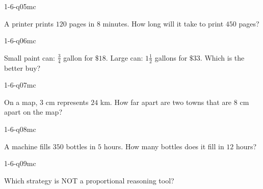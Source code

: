 \begin{practiceQuestion}{1-6-q05}{mc}
\begin{questionText}
A printer prints $120$ pages in $8$ minutes. How long will it take to print $450$ pages?
\end{questionText}
\end{practiceQuestion}

\begin{practiceQuestion}{1-6-q06}{mc}
\begin{questionText}
Small paint can: $\frac{3}{4}$ gallon for $\$18$. Large can: $1\frac{1}{2}$ gallons for $\$33$. Which is the better buy?
\end{questionText}
\end{practiceQuestion}

\begin{practiceQuestion}{1-6-q07}{mc}
\begin{questionText}
On a map, $3$ cm represents $24$ km. How far apart are two towns that are $8$ cm apart on the map?
\end{questionText}
\end{practiceQuestion}

\begin{practiceQuestion}{1-6-q08}{mc}
\begin{questionText}
A machine fills $350$ bottles in $5$ hours. How many bottles does it fill in $12$ hours?
\end{questionText}
\end{practiceQuestion}

\begin{practiceQuestion}{1-6-q09}{mc}
\begin{questionText}
Which strategy is NOT a proportional reasoning tool?
\end{questionText}
\end{practiceQuestion}

